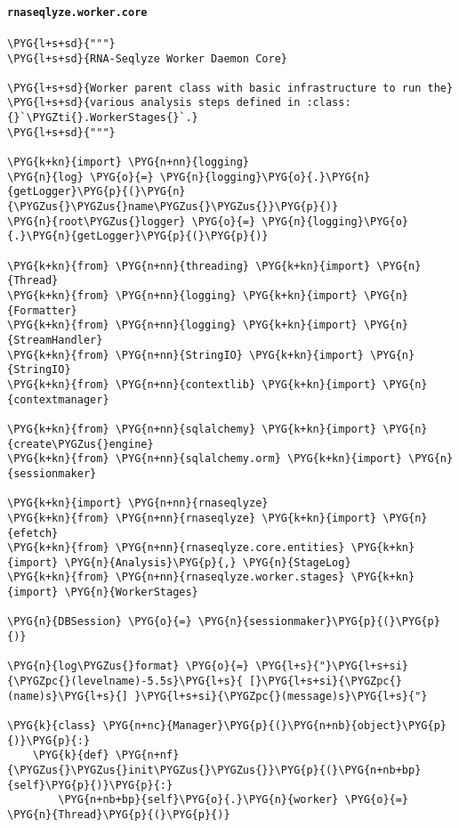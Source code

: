 \paragraph{\texttt{rnaseqlyze.worker.core}}
\label{index-pdf4:rnaseqlyze-worker-core}
\begin{Verbatim}[commandchars=\\\{\}]
\PYG{l+s+sd}{"""}
\PYG{l+s+sd}{RNA-Seqlyze Worker Daemon Core}

\PYG{l+s+sd}{Worker parent class with basic infrastructure to run the}
\PYG{l+s+sd}{various analysis steps defined in :class:{}`\PYGZti{}.WorkerStages{}`.}
\PYG{l+s+sd}{"""}

\PYG{k+kn}{import} \PYG{n+nn}{logging}
\PYG{n}{log} \PYG{o}{=} \PYG{n}{logging}\PYG{o}{.}\PYG{n}{getLogger}\PYG{p}{(}\PYG{n}{\PYGZus{}\PYGZus{}name\PYGZus{}\PYGZus{}}\PYG{p}{)}
\PYG{n}{root\PYGZus{}logger} \PYG{o}{=} \PYG{n}{logging}\PYG{o}{.}\PYG{n}{getLogger}\PYG{p}{(}\PYG{p}{)}

\PYG{k+kn}{from} \PYG{n+nn}{threading} \PYG{k+kn}{import} \PYG{n}{Thread}
\PYG{k+kn}{from} \PYG{n+nn}{logging} \PYG{k+kn}{import} \PYG{n}{Formatter}
\PYG{k+kn}{from} \PYG{n+nn}{logging} \PYG{k+kn}{import} \PYG{n}{StreamHandler}
\PYG{k+kn}{from} \PYG{n+nn}{StringIO} \PYG{k+kn}{import} \PYG{n}{StringIO}
\PYG{k+kn}{from} \PYG{n+nn}{contextlib} \PYG{k+kn}{import} \PYG{n}{contextmanager}

\PYG{k+kn}{from} \PYG{n+nn}{sqlalchemy} \PYG{k+kn}{import} \PYG{n}{create\PYGZus{}engine}
\PYG{k+kn}{from} \PYG{n+nn}{sqlalchemy.orm} \PYG{k+kn}{import} \PYG{n}{sessionmaker}

\PYG{k+kn}{import} \PYG{n+nn}{rnaseqlyze}
\PYG{k+kn}{from} \PYG{n+nn}{rnaseqlyze} \PYG{k+kn}{import} \PYG{n}{efetch}
\PYG{k+kn}{from} \PYG{n+nn}{rnaseqlyze.core.entities} \PYG{k+kn}{import} \PYG{n}{Analysis}\PYG{p}{,} \PYG{n}{StageLog}
\PYG{k+kn}{from} \PYG{n+nn}{rnaseqlyze.worker.stages} \PYG{k+kn}{import} \PYG{n}{WorkerStages}

\PYG{n}{DBSession} \PYG{o}{=} \PYG{n}{sessionmaker}\PYG{p}{(}\PYG{p}{)}

\PYG{n}{log\PYGZus{}format} \PYG{o}{=} \PYG{l+s}{"}\PYG{l+s+si}{\PYGZpc{}(levelname)-5.5s}\PYG{l+s}{ [}\PYG{l+s+si}{\PYGZpc{}(name)s}\PYG{l+s}{] }\PYG{l+s+si}{\PYGZpc{}(message)s}\PYG{l+s}{"}

\PYG{k}{class} \PYG{n+nc}{Manager}\PYG{p}{(}\PYG{n+nb}{object}\PYG{p}{)}\PYG{p}{:}
    \PYG{k}{def} \PYG{n+nf}{\PYGZus{}\PYGZus{}init\PYGZus{}\PYGZus{}}\PYG{p}{(}\PYG{n+nb+bp}{self}\PYG{p}{)}\PYG{p}{:}
        \PYG{n+nb+bp}{self}\PYG{o}{.}\PYG{n}{worker} \PYG{o}{=} \PYG{n}{Thread}\PYG{p}{(}\PYG{p}{)}


\end{Verbatim}
